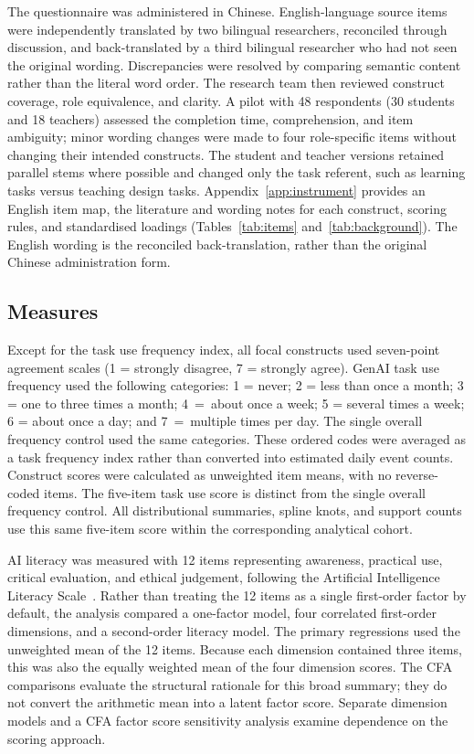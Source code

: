 \documentclass[sustainability,article,accept,moreauthors]{Definitions/mdpi}
\begin{document}
The questionnaire was administered in Chinese. English-language source items were independently translated by two bilingual researchers, reconciled through discussion, and back-translated by a third bilingual researcher who had not seen the original wording. Discrepancies were resolved by comparing semantic content rather than the literal word order. The research team then reviewed construct coverage, role equivalence, and clarity. A pilot with 48 respondents (30 students and 18 teachers) assessed the completion time, comprehension, and item ambiguity; minor wording changes were made to four role-specific items without changing their intended constructs. The student and teacher versions retained parallel stems where possible and changed only the task referent, such as learning tasks versus teaching design tasks. Appendix~\ref{app:instrument} provides an English item map, the literature and wording notes for each construct, scoring rules, and standardised loadings (Tables~\ref{tab:items} and~\ref{tab:background}). The English wording is the reconciled back-translation, rather than the original Chinese administration form.

\subsection{Measures}\label{sec:measures}

Except for the task use frequency index, all focal constructs used seven-point agreement scales (1 = strongly disagree, 7 = strongly agree). GenAI task use frequency used the following categories: 1 = never; 2 = less than once a month; 3 = one to three times a month; 4~=~about once a week; 5 = several times a week; 6 = about once a day; and 7~=~multiple times per day. The single overall frequency control used the same categories. These ordered codes were averaged as a task frequency index rather than converted into estimated daily event counts. Construct scores were calculated as unweighted item means, with no reverse-coded items. The five-item task use score is distinct from the single overall frequency control. All distributional summaries, spline knots, and support counts use this same five-item score within the corresponding analytical cohort.

AI literacy was measured with 12 items representing awareness, practical use, critical evaluation, and ethical judgement, following the Artificial Intelligence Literacy Scale~\cite{wang2023}. Rather than treating the 12 items as a single first-order factor by default, the analysis compared a one-factor model, four correlated first-order dimensions, and a second-order literacy model. The primary regressions used the unweighted mean of the 12 items. Because each dimension contained three items, this was also the equally weighted mean of the four dimension scores. The CFA comparisons evaluate the structural rationale for this broad summary; they do not convert the arithmetic mean into a latent factor score. Separate dimension models and a CFA factor score sensitivity analysis examine dependence on the scoring approach.
\end{document}
